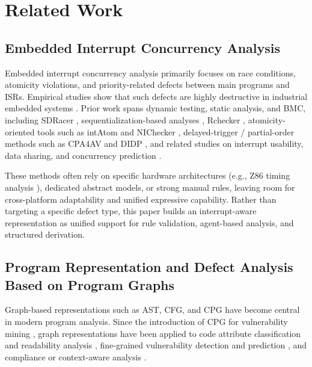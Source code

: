 \documentclass[a4paper,UKenglish,cleveref, autoref, thm-restate]{lipics-v2021}
\begin{document}
\FloatBarrier
\section{Related Work}

\subsection{Embedded Interrupt Concurrency Analysis}

Embedded interrupt concurrency analysis primarily focuses on race conditions, atomicity violations, and priority-related defects between main programs and ISRs. Empirical studies show that such defects are highly destructive in industrial embedded systems \cite{li2023empirical}. Prior work spans dynamic testing, static analysis, and BMC, including SDRacer \cite{wang2017automatic}, sequentialization-based analyses \cite{wu2015numerical, wu2016static}, Rchecker \cite{feng2020rchecker}, atomicity-oriented tools such as intAtom and NIChecker \cite{li2022precise, zhang2025bounded}, delayed-trigger / partial-order methods such as CPA4AV and DIDP \cite{yu2023detecting, zhao2025formal}, and related studies on interrupt usability, data sharing, and concurrency prediction \cite{pan2019easy, wang2022specchecker, wang2025specchecker, yu2018conpredictor}.

These methods often rely on specific hardware architectures (e.g., Z86 timing analysis \cite{brylow2004deadline}), dedicated abstract models, or strong manual rules, leaving room for cross-platform adaptability and unified expressive capability. Rather than targeting a specific defect type, this paper builds an interrupt-aware representation as unified support for rule validation, agent-based analysis, and structured derivation.

\subsection{Program Representation and Defect Analysis Based on Program Graphs}

Graph-based representations such as AST, CFG, and CPG have become central in modern program analysis. Since the introduction of CPG for vulnerability mining \cite{yamaguchi2014modeling}, graph representations have been applied to code attribute classification and readability analysis \cite{liu2023learning, mi2023graph}, fine-grained vulnerability detection and prediction \cite{zhu2023code, shao2025graphfvd, nadim2022leveraging}, and compliance or context-aware analysis \cite{shezan2023chkplug, lekssays2025llmxcpg}.
\end{document}
